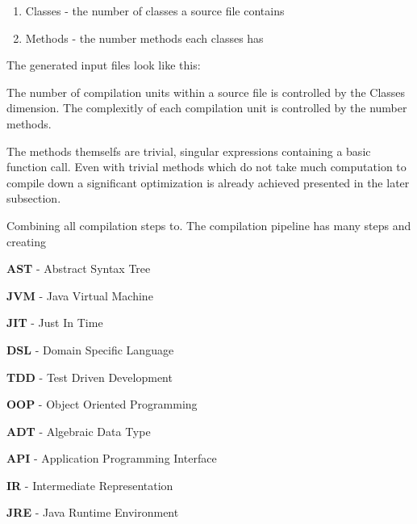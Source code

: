 \documentclass{VUMIFPSbakalaurinis}
\begin{document}
\begin{enumerate}
\item{Classes - the number of classes a source file contains}
\item{Methods - the number methods each classes has}
\end{enumerate}

The generated input files look like this:



The number of compilation units within a source file is controlled by the Classes dimension. The complexitly of each compilation unit is controlled by the number methods.

The methods themselfs are trivial, singular expressions containing a basic function call.
Even with trivial methods which do not take much computation to compile down a significant optimization is already achieved presented in the later subsection.

Combining all compilation steps to.
The compilation pipeline has many steps and creating 




\textbf{AST} - Abstract Syntax Tree

\textbf{JVM} - Java Virtual Machine

\textbf{JIT} - Just In Time

\textbf{DSL} - Domain Specific Language

\textbf{TDD} - Test Driven Development

\textbf{OOP} - Object Oriented Programming

\textbf{ADT} - Algebraic Data Type

\textbf{API} - Application Programming Interface

\textbf{IR} - Intermediate Representation

\textbf{JRE} - Java Runtime Environment

\appendix  %

\printbibliography[heading=bibintoc]
\end{document}
